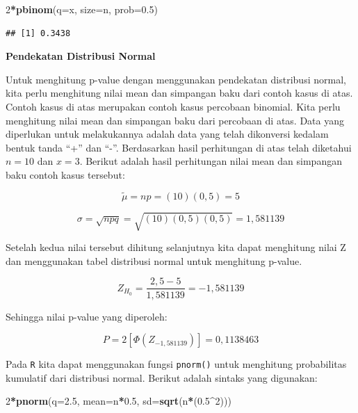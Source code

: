\documentclass[]{book}
\newenvironment{Shaded}{\begin{snugshade}}{\end{snugshade}}
\newcommand{\KeywordTok}[1]{\textcolor[rgb]{0.13,0.29,0.53}{\textbf{#1}}}
\newcommand{\DataTypeTok}[1]{\textcolor[rgb]{0.13,0.29,0.53}{#1}}
\newcommand{\DecValTok}[1]{\textcolor[rgb]{0.00,0.00,0.81}{#1}}
\newcommand{\FloatTok}[1]{\textcolor[rgb]{0.00,0.00,0.81}{#1}}
\newcommand{\OperatorTok}[1]{\textcolor[rgb]{0.81,0.36,0.00}{\textbf{#1}}}
\newcommand{\NormalTok}[1]{#1}
\begin{document}
\begin{Shaded}
\begin{Highlighting}[]
\DecValTok{2}\OperatorTok{*}\KeywordTok{pbinom}\NormalTok{(}\DataTypeTok{q=}\NormalTok{x, }\DataTypeTok{size=}\NormalTok{n, }\DataTypeTok{prob=}\FloatTok{0.5}\NormalTok{)}
\end{Highlighting}
\end{Shaded}

\begin{verbatim}
## [1] 0.3438
\end{verbatim}

\textbf{Pendekatan Distribusi Normal}

Untuk menghitung p-value dengan menggunakan pendekatan distribusi
normal, kita perlu menghitung nilai mean dan simpangan baku dari contoh
kasus di atas. Contoh kasus di atas merupakan contoh kasus percobaan
binomial. Kita perlu menghitung nilai mean dan simpangan baku dari
percobaan di atas. Data yang diperlukan untuk melakukannya adalah data
yang telah dikonversi kedalam bentuk tanda ``+'' dan ``-''. Berdasarkan
hasil perhitungan di atas telah diketahui \(n=10\) dan \(x=3\). Berikut
adalah hasil perhitungan nilai mean dan simpangan baku contoh kasus
tersebut:

\[
\tilde{\mu}=np=\left(10\right)\left(0,5\right)=5
\]

\[
\sigma=\sqrt{npq}=\sqrt{\left(10\right)\left(0,5\right)\left(0,5\right)}=1,581139
\]

Setelah kedua nilai tersebut dihitung selanjutnya kita dapat menghitung
nilai Z dan menggunakan tabel distribusi normal untuk menghitung
p-value.

\[
Z_{H_0}=\frac{2,5-5}{1,581139}=-1,581139
\]

Sehingga nilai p-value yang diperoleh:

\[
P=2\left[\Phi\left(Z_{-1,581139}\right)\right]=0,1138463
\]

Pada \texttt{R} kita dapat menggunakan fungsi \texttt{pnorm()} untuk
menghitung probabilitas kumulatif dari distribusi normal. Berikut adalah
sintaks yang digunakan:

\begin{Shaded}
\begin{Highlighting}[]
\DecValTok{2}\OperatorTok{*}\KeywordTok{pnorm}\NormalTok{(}\DataTypeTok{q=}\FloatTok{2.5}\NormalTok{, }\DataTypeTok{mean=}\NormalTok{n}\OperatorTok{*}\FloatTok{0.5}\NormalTok{, }\DataTypeTok{sd=}\KeywordTok{sqrt}\NormalTok{(n}\OperatorTok{*}\NormalTok{(}\FloatTok{0.5}\OperatorTok{^}\DecValTok{2}\NormalTok{)))}
\end{Highlighting}
\end{Shaded}
\end{document}
